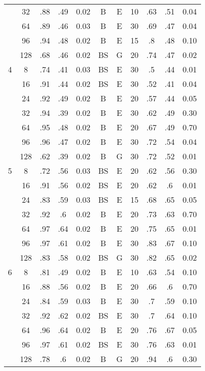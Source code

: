 \begin{table}
\begin{tabular}{|c|c|cccccc||ccc|}
  &  32 &   .88 &  .49 &     0.02 &       B &         E & 10 &   .63 &  .51 & 0.04 \\
  &  64 &   .89 &  .46 &     0.03 &       B &         E & 30 &   .69 &  .47 & 0.04 \\
  &  96 &   .94 &  .48 &     0.02 &       B &         E & 15 &    .8 &  .48 & 0.10 \\
  & 128 &   .68 &  .46 &     0.02 &      BS &         G & 20 &   .74 &  .47 & 0.02 \\\hline
4 &   8 &   .74 &  .41 &     0.03 &      BS &         E & 30 &    .5 &  .44 & 0.01 \\
  &  16 &   .91 &  .44 &     0.02 &      BS &         E & 30 &   .52 &  .41 & 0.04 \\
  &  24 &   .92 &  .49 &     0.02 &       B &         E & 20 &   .57 &  .44 & 0.05 \\
  &  32 &   .94 &  .39 &     0.02 &       B &         E & 30 &   .62 &  .49 & 0.30 \\
  &  64 &   .95 &  .48 &     0.02 &       B &         E & 20 &   .67 &  .49 & 0.70 \\
  &  96 &   .96 &  .47 &     0.02 &       B &         E & 30 &   .72 &  .54 & 0.04 \\
  & 128 &   .62 &  .39 &     0.02 &       B &         G & 30 &   .72 &  .52 & 0.01 \\\hline
5 &   8 &   .72 &  .56 &     0.03 &      BS &         E & 20 &   .62 &  .56 & 0.30 \\
  &  16 &   .91 &  .56 &     0.02 &      BS &         E & 20 &   .62 &   .6 & 0.01 \\
  &  24 &   .83 &  .59 &     0.03 &      BS &         E & 15 &   .68 &  .65 & 0.05 \\
  &  32 &   .92 &   .6 &     0.02 &       B &         E & 20 &   .73 &  .63 & 0.70 \\
  &  64 &   .97 &  .64 &     0.02 &       B &         E & 20 &   .75 &  .65 & 0.01 \\
  &  96 &   .97 &  .61 &     0.02 &       B &         E & 30 &   .83 &  .67 & 0.10 \\
  & 128 &   .83 &  .58 &     0.02 &      BS &         G & 30 &   .82 &  .65 & 0.02 \\\hline
6 &   8 &   .81 &  .49 &     0.02 &       B &         E & 10 &   .63 &  .54 & 0.10 \\
  &  16 &   .88 &  .56 &     0.02 &       B &         E & 20 &   .66 &   .6 & 0.70 \\
  &  24 &   .84 &  .59 &     0.03 &       B &         E & 30 &    .7 &  .59 & 0.10 \\
  &  32 &   .92 &  .62 &     0.02 &      BS &         E & 30 &    .7 &  .64 & 0.10 \\
  &  64 &   .96 &  .64 &     0.02 &       B &         E & 20 &   .76 &  .67 & 0.05 \\
  &  96 &   .97 &  .61 &     0.02 &      BS &         E & 30 &   .76 &  .63 & 0.01 \\
  & 128 &   .78 &   .6 &     0.02 &       B &         G & 20 &   .94 &   .6 & 0.30 \\\hline
\end{tabular}
\end{table}

